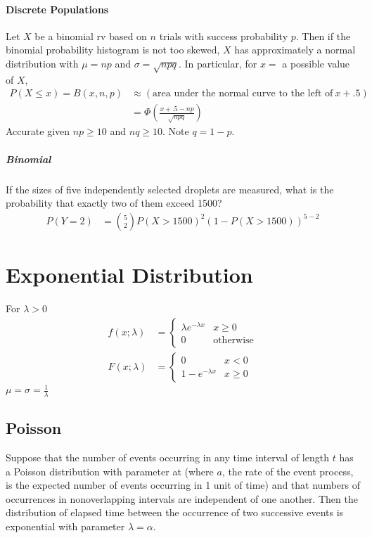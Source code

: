 \documentclass[paper=A4, pagesize, fontsize=7pt, DIV=calc]{scrartcl}
\begin{document}
\begin{minipage}[t]{.45\linewidth}
  \paragraph{Discrete Populations}
  Let $X$ be a binomial rv based on $n$ trials with success probability $p$. Then if the binomial probability histogram is not too skewed, $X$ has approximately a normal distribution with $\mu = np$ and $\sigma = \sqrt{npq}$. In particular, for $x =$ a possible value of $X$,
  \begin{align*}
    P(X \le x) = B(x, n, p) &\approx (\text{area under the normal curve to the left of}\ x + .5) \\
    &= \Phi\left(\frac{x + .5 - np}{\sqrt{npq}}\right)
  \end{align*}
  Accurate given $np \ge 10$ and $nq \ge 10$. Note $q = 1 - p$.

  \subparagraph{Binomial}
  If the sizes of five independently selected droplets are measured, what is the probability that exactly two of them exceed 1500?
  \begin{align*}
    P(Y = 2) &= \binom{5}{2} P(X > 1500)^{2} (1 - P(X > 1500))^{5 - 2}
  \end{align*}

  \section{Exponential Distribution}
  For $\lambda > 0$
  \begin{align*}
    f(x; \lambda) &= \begin{cases}
      \lambda e^{-\lambda x} & x \ge 0 \\
      0                      & \text{otherwise}
    \end{cases} \\
    F(x; \lambda) &= \begin{cases}
      0                  & x < 0 \\
      1 - e^{-\lambda x} & x \ge 0
    \end{cases}
  \end{align*}
  $\mu = \sigma = \frac{1}{\lambda}$

  \subsection{Poisson}
  Suppose that the number of events occurring in any time interval of length $t$ has a Poisson distribution with parameter at (where $a$, the rate of the event process, is the expected number of events occurring in 1 unit of time) and that numbers of occurrences in nonoverlapping intervals are independent of one another. Then the distribution of elapsed time between the occurrence of two successive events is exponential with parameter $\lambda = \alpha$.


\end{minipage}
\end{document}
